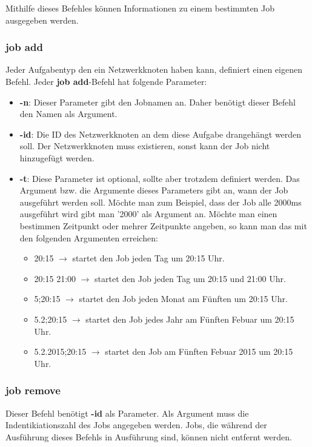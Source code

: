 \documentclass[12pt,a4paper]{report}
\begin{document}
\begin{onehalfspace}
Mithilfe dieses Befehles können Informationen zu einem bestimmten Job ausgegeben werden.

\subsubsection{job add}

Jeder Aufgabentyp den ein Netzwerkknoten haben kann, definiert einen eigenen Befehl. Jeder \textbf{job add}-Befehl hat folgende Parameter:

\begin{itemize}
\item \textbf{-n}: Dieser Parameter gibt den Jobnamen an. Daher benötigt dieser Befehl den Namen als Argument.
\item \textbf{-id}: Die ID des Netzwerkknoten an dem diese Aufgabe drangehängt werden soll. Der Netzwerkknoten muss existieren, sonst kann der Job nicht hinzugefügt werden.
\item \textbf{-t}: Diese Parameter ist optional, sollte aber trotzdem definiert werden. Das Argument bzw. die Argumente dieses Parameters gibt an, wann der Job ausgeführt werden soll. Möchte man zum Beispiel, dass der Job alle 2000ms ausgeführt wird gibt man '2000' als Argument an. Möchte man einen bestimmen Zeitpunkt oder mehrer Zeitpunkte angeben, so kann man das mit den folgenden Argumenten erreichen:
  \begin{itemize}
  \item 20:15 $\rightarrow$ startet den Job jeden Tag um 20:15 Uhr.
  \item 20:15 21:00 $\rightarrow$ startet den Job jeden Tag um 20:15 und 21:00 Uhr.
  \item 5;20:15 $\rightarrow$ startet den Job jeden Monat am Fünften um 20:15 Uhr.
  \item 5.2;20:15 $\rightarrow$ startet den Job jedes Jahr am Fünften Febuar um 20:15 Uhr.
  \item 5.2.2015;20:15 $\rightarrow$ startet den Job am Fünften Febuar 2015 um 20:15 Uhr.
  \end{itemize}
\end{itemize}

\subsubsection{job remove}

Dieser Befehl benötigt \textbf{-id} als Parameter. Als Argument muss die Indentikiationszahl des Jobs angegeben werden. Jobs, die während der Ausführung dieses Befehls in Ausführung sind, können nicht entfernt werden.


\end{onehalfspace}
\end{document}
